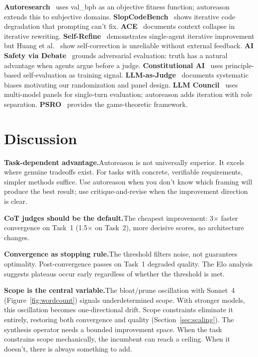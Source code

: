 \documentclass[10pt,twocolumn]{article}
\begin{document}
\textbf{Autoresearch}~\cite{autoresearch} uses val\_bpb as an objective fitness function; autoreason extends this to subjective domains. \textbf{SlopCodeBench}~\cite{slopcodebench} shows iterative code degradation that prompting can't fix. \textbf{ACE}~\cite{ace} documents context collapse in iterative rewriting. \textbf{Self-Refine}~\cite{selfrefine} demonstrates single-agent iterative improvement but Huang et al.~\cite{huang2023} show self-correction is unreliable without external feedback. \textbf{AI Safety via Debate}~\cite{irving2018} grounds adversarial evaluation: truth has a natural advantage when agents argue before a judge. \textbf{Constitutional AI}~\cite{bai2022} uses principle-based self-evaluation as training signal. \textbf{LLM-as-Judge}~\cite{zheng2023} documents systematic biases motivating our randomization and panel design. \textbf{LLM Council}~\cite{llmcouncil} uses multi-model panels for single-turn evaluation; autoreason adds iteration with role separation. \textbf{PSRO}~\cite{psro} provides the game-theoretic framework.

\section{Discussion}

\textbf{Task-dependent advantage.}\enspace Autoreason is not universally superior. It excels where genuine tradeoffs exist. For tasks with concrete, verifiable requirements, simpler methods suffice. Use autoreason when you don't know which framing will produce the best result; use critique-and-revise when the improvement direction is clear.

\textbf{CoT judges should be the default.}\enspace The cheapest improvement: 3$\times$ faster convergence on Task~1 (1.5$\times$ on Task~2), more decisive scores, no architecture changes.

\textbf{Convergence as stopping rule.}\enspace The threshold filters noise, not guarantees optimality. Post-convergence passes on Task~1 degraded quality. The Elo analysis suggests plateaus occur early regardless of whether the threshold is met.

\textbf{Scope is the central variable.}\enspace The bloat/prune oscillation with Sonnet~4 (Figure~\ref{fig:wordcount}) signals underdetermined scope. With stronger models, this oscillation becomes one-directional drift. Scope constraints eliminate it entirely, restoring both convergence and quality (Section~\ref{sec:scaling}). The synthesis operator needs a bounded improvement space. When the task constrains scope mechanically, the incumbent can reach a ceiling. When it doesn't, there is always something to add.
\end{document}
